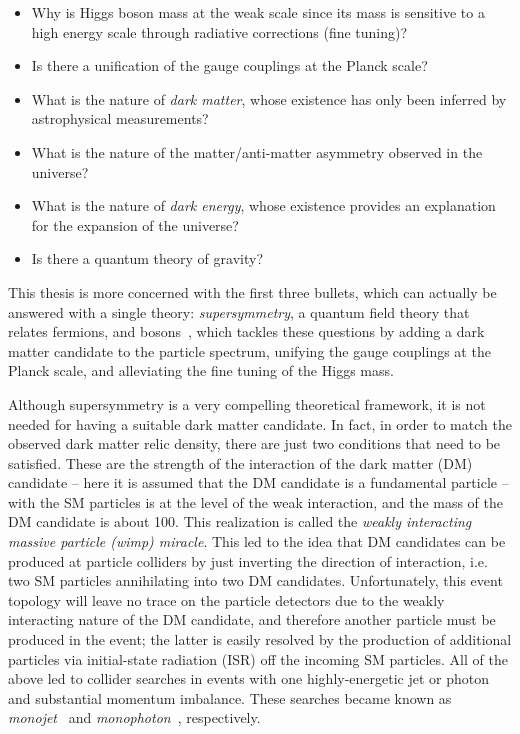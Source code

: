 \begin{itemize}
\item Why is Higgs boson mass at the weak scale since its mass is
  sensitive to a high energy scale through radiative corrections (fine
  tuning)?
\item Is there a unification of the gauge couplings at the Planck scale?
\item What is the nature of \textit{dark matter}, whose existence
  has only been inferred by astrophysical measurements?
\item What is the nature of the matter/anti-matter asymmetry observed
  in the universe?
\item  What is the nature of \textit{dark energy}, whose existence provides an
  explanation for the expansion of the universe?
\item Is there a quantum theory of gravity?
\end{itemize} 

This thesis is more concerned with the first three bullets, which can
actually be answered with a single theory: \textit{supersymmetry}, a
quantum field theory that relates fermions, and bosons~\cite{susy1,susy2,susy3,susy4,susy5,susy6,susy7}, which tackles
these questions by adding a dark matter candidate to the
particle spectrum, unifying the gauge couplings at the Planck scale,
and alleviating the fine tuning of the Higgs mass.

Although supersymmetry is a very compelling theoretical framework, it is not needed for having
a suitable dark matter candidate. In fact, in order to match
the observed dark matter relic density, there are just two
conditions that need to be satisfied. These are the strength of the interaction of the dark matter (DM)
candidate -- here it is assumed that the DM candidate is a fundamental
particle -- with the SM particles is at the level of the weak interaction,
and the mass of the DM candidate is about 100\GeV. This realization is
called the \textit{weakly interacting massive particle (wimp)
  miracle}. This led to the idea that DM candidates can be
produced at particle colliders by just inverting the direction of
interaction, i.e. two SM particles annihilating into two DM
candidates. Unfortunately, this event topology will leave no trace on the particle
detectors due to the weakly interacting nature of the DM candidate,
and therefore another particle must be produced in the event; the latter is
easily resolved by the production of additional particles via
initial-state radiation (ISR) off the incoming SM
particles. All of the above led to collider searches in events with one highly-energetic jet
or photon and substantial momentum imbalance. These searches became known as \textit{monojet}~\cite{Aad:2011xw,Chatrchyan:2012me} and
\textit{monophoton}~\cite{Khachatryan:2014rwa,Aad:2014tda},
respectively.

